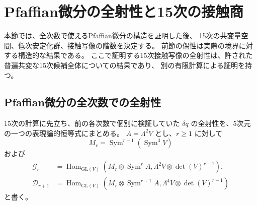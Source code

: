\documentclass[a4paper,11pt]{ltjsarticle}
\theoremstyle{definition}
\begin{document}
\clearpage
\section{Pfaffian微分の全射性と15次の接触商}
\label{sec:contact-fifteen}

本節では、全次数で使えるPfaffian微分の構造を証明した後、
15次の共変量空間、低次安定化群、接触写像の階数を決定する。
前節の偶性は実際の境界に対する構造的な結果である。
ここで証明する15次接触写像の全射性は、許された普遍共変な15次候補全体についての結果であり、
別の有限計算による証明を持つ。

\subsection{Pfaffian微分の全次数での全射性}
\label{subsec:v12-uniform-pfaffian}

15次の計算に先立ち、前の各次数で個別に検証していた
$\delta q$ の全射性を、5次元の一つの表現論的恒等式にまとめる。
$A=\Lambda^2V$ とし、$r\ge1$ に対して
\[
 M_r=\operatorname{Sym}^{r-1}(\operatorname{Sym}^3V)
\]
および
\begin{align*}
 \mathcal G_r&=\operatorname{Hom}_{\mathrm{GL}(V)}
 \left(M_r\otimes\operatorname{Sym}^r A,
        \Lambda^2V\otimes\det(V)^{r-1}\right),\\
 \mathcal D_{r+1}&=\operatorname{Hom}_{\mathrm{GL}(V)}
 \left(M_r\otimes\operatorname{Sym}^{r+1} A,
        \Lambda^4V\otimes\det(V)^{r-1}\right)
\end{align*}
と書く。
\end{document}
